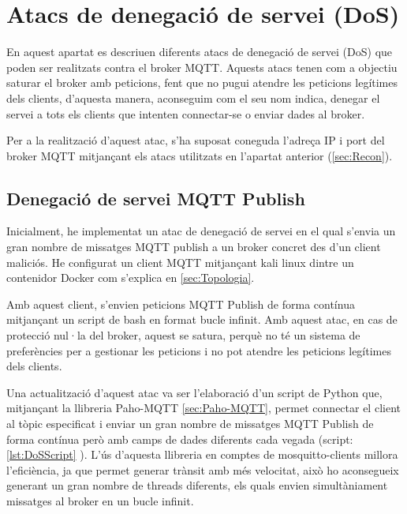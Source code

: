 \section{Atacs de denegació de servei (DoS)}

En aquest apartat es descriuen diferents atacs de denegació de servei (DoS) que poden ser realitzats contra el broker MQTT. Aquests atacs tenen com a objectiu saturar el broker amb peticions, fent que no pugui atendre les peticions legítimes dels clients, d'aquesta manera, aconseguim com el seu nom indica, denegar el servei a tots els clients que intenten connectar-se o enviar dades al broker.

Per a la realització d'aquest atac, s'ha suposat coneguda l'adreça IP i port del broker MQTT mitjançant els atacs utilitzats en l'apartat anterior (\ref{sec:Recon}).

\subsection{Denegació de servei MQTT Publish}

Inicialment, he implementat un atac de denegació de servei en el qual s'envia un gran nombre de missatges MQTT publish a un broker concret des d'un client maliciós. He configurat un client MQTT mitjançant kali linux dintre un contenidor Docker com s'explica en \ref{sec:Topologia}.

Amb aquest client, s'envien peticions MQTT Publish de forma contínua mitjançant un script de bash en format bucle infinit. Amb aquest atac, en cas de protecció nul·la del broker, aquest se satura, perquè no té un sistema de preferències per a gestionar les peticions i no pot atendre les peticions legítimes dels clients.

Una actualització d'aquest atac va ser l'elaboració d'un script de Python que, mitjançant la llibreria Paho-MQTT \ref{sec:Paho-MQTT}, permet connectar el client al tòpic especificat i enviar un gran nombre de missatges MQTT Publish de forma contínua però amb camps de dades diferents cada vegada (script: \ref{lst:DoSScript} ). L'ús d'aquesta llibreria en comptes de mosquitto-clients millora l'eficiència, ja que permet generar trànsit amb més velocitat, això ho aconsegueix generant un gran nombre de threads diferents, els quals envien simultàniament missatges al broker en un bucle infinit.

